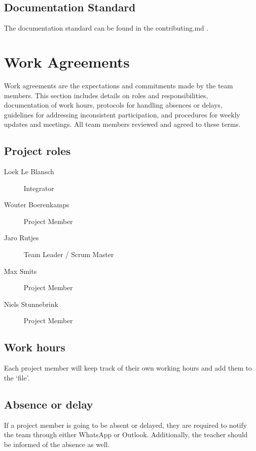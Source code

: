 \documentclass{projdoc}
\begin{document}
\subsection{Documentation Standard}

The documentation standard can be found in the contributing.md
\autocite{crepe:docs-standard}.

\section{Work Agreements}

Work agreements are the expectations and commitments made by the team members. This
section includes details on roles and responsibilities, documentation of work hours,
protocols for handling absences or delays, guidelines for addressing inconsistent
participation, and procedures for weekly updates and meetings. All team members
reviewed and agreed to these terms.

\subsection{Project roles}

\begin{description}
	\item[Loek Le Blansch] Integrator
	\item[Wouter Boerenkamps] Project Member
	\item[Jaro Rutjes] Team Leader / Scrum Master
	\item[Max Smits] Project Member
	\item[Niels Stunnebrink] Project Member
\end{description}

\subsection{Work hours}

Each project member will keep track of their own working hours and add them to the
`file'.

\subsection{Absence or delay}

If a project member is going to be absent or delayed, they are required to
notify the team through either WhatsApp or Outlook. Additionally, the teacher
should be informed of the absence as well.
\end{document}
